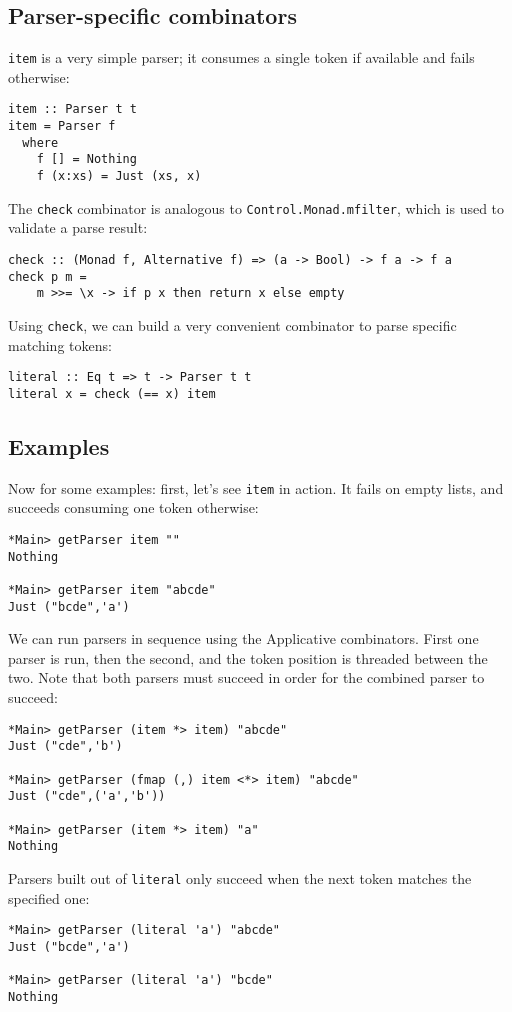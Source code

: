\documentclass{tmr}
\begin{document}
\subsection{Parser-specific combinators}
\verb+item+ is a very simple parser; it 
consumes a single token if available and fails otherwise:
\begin{verbatim}
item :: Parser t t
item = Parser f
  where 
    f [] = Nothing
    f (x:xs) = Just (xs, x)
\end{verbatim}

The \verb+check+ combinator is analogous to \verb+Control.Monad.mfilter+, which is used to
validate a parse result:
\begin{verbatim}
check :: (Monad f, Alternative f) => (a -> Bool) -> f a -> f a
check p m =
    m >>= \x -> if p x then return x else empty
\end{verbatim}

Using \verb+check+, we can build a very convenient combinator to parse specific
matching tokens: 
\begin{verbatim}
literal :: Eq t => t -> Parser t t
literal x = check (== x) item
\end{verbatim}

\subsection{Examples}
Now for some examples:  first, let's see \verb+item+ in action.  It fails on empty lists,
and succeeds consuming one token otherwise:
\begin{verbatim}
*Main> getParser item ""
Nothing

*Main> getParser item "abcde"
Just ("bcde",'a')
\end{verbatim}

We can run parsers in sequence using the Applicative combinators.  First one parser
is run, then the second, and the token position is threaded between the two.
Note that both parsers must succeed in order for the combined parser to succeed:
\begin{verbatim}
*Main> getParser (item *> item) "abcde"
Just ("cde",'b')

*Main> getParser (fmap (,) item <*> item) "abcde"
Just ("cde",('a','b'))

*Main> getParser (item *> item) "a"
Nothing
\end{verbatim}

Parsers built out of \verb+literal+ only succeed when the next token matches 
the specified one:
\begin{verbatim}
*Main> getParser (literal 'a') "abcde"
Just ("bcde",'a')

*Main> getParser (literal 'a') "bcde"
Nothing
\end{verbatim}
\end{document}
